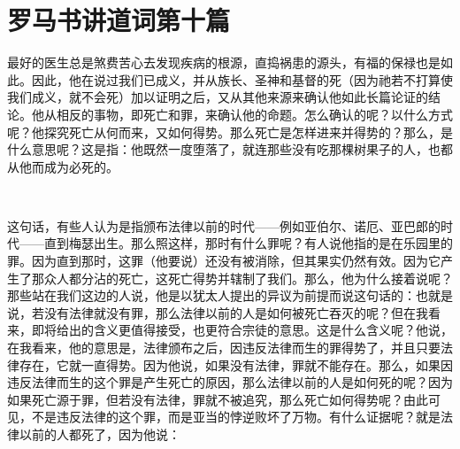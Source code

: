 

\section{罗马书讲道词第十篇}

\par

\par

最好的医生总是煞费苦心去发现疾病的根源，直捣祸患的源头，有福的保禄也是如此。因此，他在说过我们已成义，并从族长、圣神和基督的死（因为祂若不打算使我们成义，就不会死）加以证明之后，又从其他来源来确认他如此长篇论证的结论。他从相反的事物，即死亡和罪，来确认他的命题。怎么确认的呢？以什么方式呢？他探究死亡从何而来，又如何得势。那么死亡是怎样进来并得势的？那么，是什么意思呢？这是指：他既然一度堕落了，就连那些没有吃那棵树果子的人，也都从他而成为必死的。\par

　\par

这句话，有些人认为是指颁布法律以前的时代——例如亚伯尔、诺厄、亚巴郎的时代——直到梅瑟出生。那么照这样，那时有什么罪呢？有人说他指的是在乐园里的罪。因为直到那时，这罪（他要说）还没有被消除，但其果实仍然有效。因为它产生了那众人都分沾的死亡，这死亡得势并辖制了我们。那么，他为什么接着说呢？那些站在我们这边的人说，他是以犹太人提出的异议为前提而说这句话的：也就是说，若没有法律就没有罪，那么法律以前的人是如何被死亡吞灭的呢？但在我看来，即将给出的含义更值得接受，也更符合宗徒的意思。这是什么含义呢？他说，在我看来，他的意思是，法律颁布之后，因违反法律而生的罪得势了，并且只要法律存在，它就一直得势。因为他说，如果没有法律，罪就不能存在。那么，如果因违反法律而生的这个罪是产生死亡的原因，那么法律以前的人是如何死的呢？因为如果死亡源于罪，但若没有法律，罪就不被追究，那么死亡如何得势呢？由此可见，不是违反法律的这个罪，而是亚当的悖逆败坏了万物。有什么证据呢？就是法律以前的人都死了，因为他说：\par

